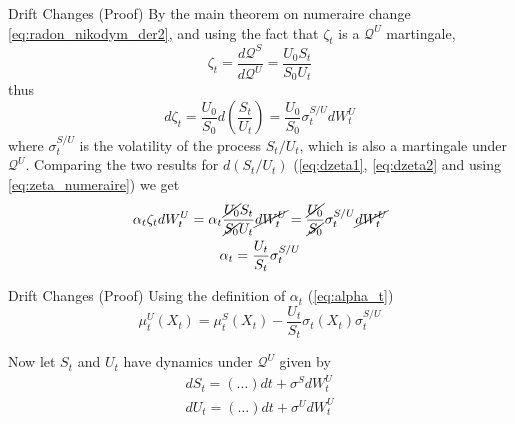 \documentclass{beamer}
\begin{document}
\begin{frame}{Drift Changes (Proof)}
	By the main theorem on numeraire change \cref{eq:radon_nikodym_der2}, and using the fact that $\zeta_t$ is a $\mathcal{Q}^U$ martingale, 
	\begin{equation}
	\zeta_t = \frac{d\mathcal{Q}^S}{d\mathcal{Q}^U} = \frac{U_0S_t}{S_0U_t}
	\label{eq:zeta_numeraire}
	\end{equation}
	thus
	\begin{equation}
	d\zeta_t= \frac{U_0}{S_0}d\left(\frac{S_t}{U_t}\right)= \frac{U_0}{S_0}\sigma_t^{S/U}dW_t^U
	\label{eq:dzeta2}
	\end{equation}
	where $\sigma^{S/U}_t$ is the volatility of the process $S_t/U_t$, which is also a martingale under $\mathcal{Q}^U$. Comparing the two results for $d(S_t/U_t)$ (\cref{eq:dzeta1}, \cref{eq:dzeta2} and using \cref{eq:zeta_numeraire}) we get
	\begin{equation}
		\begin{gathered}
		\alpha_t\zeta_tdW_t^U = \alpha_t\frac{\cancel{U_0}S_t}{\cancel{S_0}U_t}\cancel{dW_t^U}=	\frac{\cancel{U_0}}{\cancel{S_0}}\sigma^{S/U}_t\cancel{dW_t^U} \\
		\alpha_t = \frac{U_t}{S_t}\sigma^{S/U}_t
		\end{gathered}
	\end{equation}
\end{frame}

\begin{frame}{Drift Changes (Proof)}
	Using the definition of $\alpha_t$ (\cref{eq:alpha_t})
	\begin{equation}
	\mu_t^U(X_t)=\mu_t^S(X_t)-\frac{U_t}{S_t}\sigma_t(X_t)\sigma^{S/U}_t
	\label{eq:alpha}
	\end{equation}
	
	Now let $S_t$ and $U_t$ have dynamics under $\mathcal{Q}^U$ given by 
	\begin{equation*}
		\begin{gathered}
			dS_t = (\ldots) dt + \sigma^S dW^U_t\\
			dU_t = (\ldots) dt + \sigma^U dW^U_t 
		\end{gathered}
	\end{equation*}
\end{frame}
\end{document}
